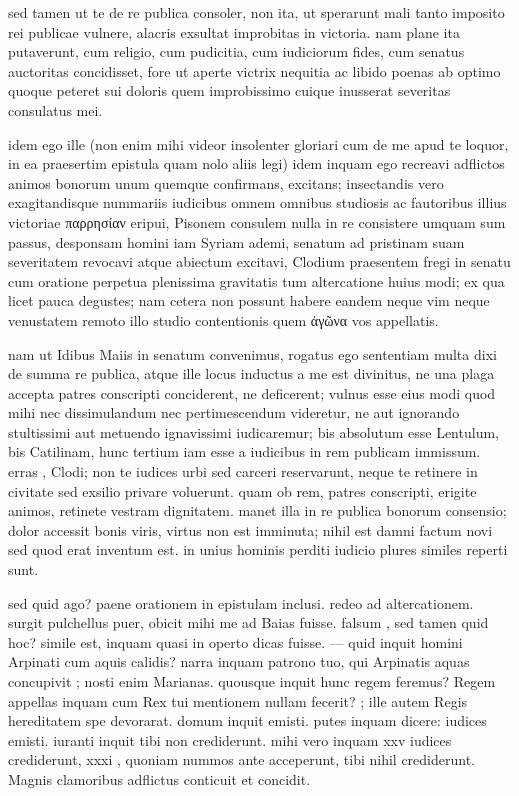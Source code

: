  sed tamen ut te de re publica consoler, non ita, ut sperarunt mali tanto imposito rei publicae vulnere, alacris exsultat improbitas in victoria. nam plane ita putaverunt, cum religio, cum pudicitia, cum iudiciorum fides, cum senatus auctoritas concidisset, fore ut aperte victrix nequitia ac libido poenas ab optimo quoque peteret sui doloris quem improbissimo cuique inusserat severitas consulatus mei.

 idem ego ille (non enim mihi videor insolenter gloriari cum de me apud te loquor, in ea praesertim epistula quam nolo aliis legi) idem inquam ego recreavi adflictos animos bonorum unum quemque confirmans, excitans; insectandis vero exagitandisque nummariis iudicibus omnem omnibus studiosis ac fautoribus illius victoriae παρρησίαν eripui, Pisonem consulem nulla in re consistere umquam sum passus, desponsam homini iam Syriam ademi, senatum ad pristinam suam severitatem revocavi atque abiectum excitavi, Clodium praesentem fregi in senatu cum oratione perpetua plenissima gravitatis tum altercatione huius modi; ex qua licet pauca degustes; nam cetera non possunt habere eandem neque vim neque venustatem remoto illo studio contentionis quem ἀγῶνα vos appellatis.

 nam ut Idibus Maiis in senatum convenimus, rogatus ego sententiam multa dixi de summa re publica, atque ille locus inductus a me est divinitus, ne una plaga accepta patres conscripti conciderent, ne deficerent; vulnus esse eius modi quod mihi nec dissimulandum nec pertimescendum videretur, ne aut ignorando stultissimi aut metuendo ignavissimi iudicaremur; bis absolutum esse Lentulum, bis Catilinam, hunc tertium iam esse a iudicibus in rem publicam immissum. erras , Clodi; non te iudices urbi sed carceri reservarunt, neque te retinere in civitate sed exsilio privare voluerunt. quam ob rem, patres conscripti, erigite animos, retinete vestram dignitatem. manet illa in re publica bonorum consensio; dolor accessit bonis viris, virtus non est imminuta; nihil est damni factum novi sed quod erat inventum est. in unius hominis perditi iudicio plures similes reperti sunt.

 sed quid ago? paene orationem in epistulam inclusi. redeo ad altercationem. surgit pulchellus puer, obicit mihi me ad Baias fuisse. falsum , sed tamen quid hoc? simile est, inquam quasi in operto dicas fuisse. — quid inquit homini Arpinati cum aquis calidis? narra inquam patrono tuo, qui Arpinatis aquas concupivit ; nosti enim Marianas. quousque inquit hunc regem feremus? Regem appellas inquam cum Rex tui mentionem nullam fecerit? ; ille autem Regis hereditatem spe devorarat. domum inquit emisti. putes inquam dicere: iudices emisti. iuranti inquit tibi non crediderunt. mihi vero inquam xxv iudices crediderunt, xxxi , quoniam nummos ante acceperunt, tibi nihil crediderunt. Magnis clamoribus adflictus conticuit et concidit.

